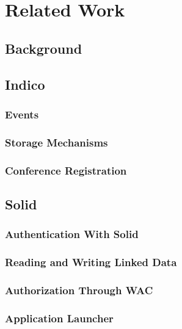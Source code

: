 \chapter{Related Work}

\section{Background}

\section{Indico}

\subsection{Events}

\subsection{Storage Mechanisms}

\subsection{Conference Registration}

\section{Solid}

\subsection{Authentication With Solid}

\subsection{Reading and Writing Linked Data}

\subsection{Authorization Through WAC}

\subsection{Application Launcher}
